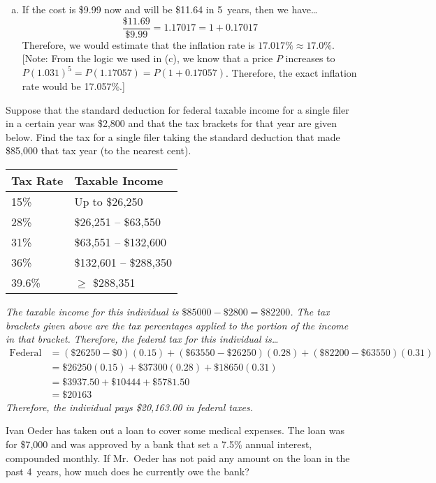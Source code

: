 \documentclass[12pt,letterpaper]{exam}
\begin{document}
\begin{questions}
{\begin{enumerate}[(a)]
\item If the cost is \$9.99 now and will be \$11.64 in 5~years, then we have\dots
	\[
	\dfrac{\$11.69}{\$9.99}= 1.17017= 1 + 0.17017
	\]
Therefore, we would estimate that the inflation rate is $17.017\% \approx 17.0\%$. [Note: From the logic we used in (c), we know that a price $P$ increases to $P(1.031)^5= P(1.17057)= P(1 + 0.17057)$. Therefore, the exact inflation rate would be 17.057\%.]
\end{enumerate}
}



\newpage
\question[15] Suppose that the standard deduction for federal taxable income for a single filer in a certain year was \$2,800 and that the tax brackets for that year are given below. Find the tax for a single filer taking the standard deduction that made \$85,000 that tax year (to the nearest cent). \par
	\begin{table}[!ht]
	\centering
	\begin{tabular}{|l|l|} \hline
	Tax Rate & Taxable Income \\ \hline \hline
	15\% & Up to \$26,250 \\ \hline
	28\% & \$26,251 -- \$63,550 \\ \hline
	31\% & \$63,551 -- \$132,600 \\ \hline
	36\% & \$132,601 -- \$288,350 \\ \hline
	39.6\% & $\geq$ \$288,351 \\ \hline
	\end{tabular}
	\end{table} \pspace

{\itshape
\sol The taxable income for this individual is $\$85000 - \$2800= \$82200$. The tax brackets given above are the tax percentages applied to the portion of the income in that bracket. Therefore, the federal tax for this individual is\dots
	\[
	\begin{aligned}
	\text{Federal Tax}&= (\$26250 - \$0)(0.15) + (\$63550 - \$26250)(0.28) + (\$82200 - \$63550)(0.31) \\[0.3cm]
	&= \$26250(0.15) + \$37300(0.28) + \$18650(0.31) \\[0.3cm]
	&= \$3937.50 + \$10444 + \$5781.50 \\[0.3cm]
	&= \$20163
	\end{aligned}
	\]
Therefore, the individual pays \$20,163.00 in federal taxes.
}



\newpage
\question[10] Ivan Oeder has taken out a loan to cover some medical expenses. The loan was for \$7,000 and was approved by a bank that set a 7.5\% annual interest, compounded monthly. If Mr.~Oeder has not paid any amount on the loan in the past 4~years, how much does he currently owe the bank? \pspace


\end{questions}
\end{document}

